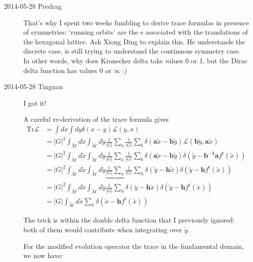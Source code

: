 \begin{description}
\item[2014-05-28 Predrag]
That's why I spent two weeks fumbling to derive trace formulas in
presence of symmetries: `running orbits' are the \rpo s associated with
the translations of the hexagonal lattice. Ask Xiong Ding to explain
this. He understands the discrete case, is still trying to understand the
continuous symmetry case. In other words, why does Kronecker delta take
values 0 or 1, but the Dirac delta function has values 0 or $\infty$ :)

\item[2014-05-28 Tingnan]

I got it!

A careful re-derivation of the trace formula gives
\begin{align*}
\mathrm{Tr}\mathcal{L} & =\int dx\int dy\delta(x-y)\mathcal{L}(y,x)\\
 & =\vert G\vert^{2}\int_{\tilde{\mathcal{M}}}d\tilde{x}\int_{\tilde{\mathcal{M}}}d\tilde{y}\frac{1}{\vert G\vert}\sum_{a}\frac{1}{\vert G\vert}\sum_{b}\delta(\mathbf{a}\tilde{x}-\mathbf{b}\tilde{y})\mathcal{L}(\mathbf{b}\tilde{y},\mathbf{a}\tilde{x})\\
 & =\vert G\vert^{2}\int_{\tilde{\mathcal{M}}}d\tilde{x}\int_{\tilde{\mathcal{M}}}d\tilde{y}\frac{1}{\vert G\vert}\sum_{a}\frac{1}{\vert G\vert}\sum_{b}\delta(\mathbf{a}\tilde{x}-\mathbf{b}\tilde{y})\delta(\tilde{y}-\mathbf{b^{-1}a}f^{t}(\tilde{x}))\\
 & =\vert G\vert^{2}\int_{\tilde{\mathcal{M}}}d\tilde{x}\int_{\tilde{\mathcal{M}}}d\tilde{y}\underbrace{\frac{1}{\vert G\vert}\sum_{a}}\frac{1}{\vert G\vert}\sum_{h}\delta(\tilde{y}-\mathbf{h}\tilde{x})\delta(\tilde{y}-\mathbf{h}f^{t}(\tilde{x}))\\
 & =\vert G\vert^{2}\int_{\tilde{\mathcal{M}}}d\tilde{x}\int_{\tilde{\mathcal{M}}}d\tilde{y}\frac{1}{\vert G\vert}\sum_{h}\delta(\tilde{y}-\mathbf{h}\tilde{x})\delta(\tilde{y}-\mathbf{h}f^{t}(\tilde{x}))\\
 & =\vert G\vert\int_{\tilde{\mathcal{M}}}d\tilde{x}\sum_{h}\delta(\tilde{x}-\mathbf{h}f^{t}(\tilde{x}))
\end{align*}

The trick is within the double delta function that I previously ignored: both of them would contribute when integrating over $\tilde{y}$.

For the modified evolution operator the trace in the fundamental domain, we now have:


\end{description}
